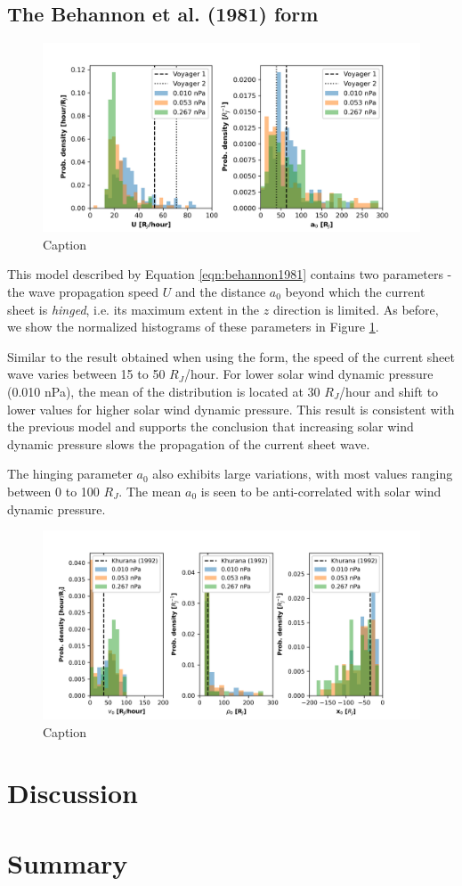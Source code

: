 \subsection{The Behannon et al. (1981) form}
\begin{figure}
    \centering
    \includegraphics[width=\textwidth]{images6/comparison_highdynP_behannon.png}
    \caption{Caption}
    \label{fig:comparison-hist-behannon}
\end{figure}

This model described by Equation \ref{eqn:behannon1981} contains two parameters - the wave propagation speed $U$ and the distance $a_0$ beyond which the current sheet is \emph{hinged}, i.e. its maximum extent in the $z$ direction is limited. As before, we show the normalized histograms of these parameters in Figure \ref{fig:comparison-hist-behannon}. 

Similar to the result obtained when using the  form, the speed of the current sheet wave varies between 15 to 50 $R_J$/hour. For lower solar wind dynamic pressure (0.010 nPa), the mean of the distribution is located at 30 $R_J$/hour and shift to lower values for higher solar wind dynamic pressure. This result is consistent with the previous model and supports the conclusion that increasing solar wind dynamic pressure slows the propagation of the current sheet wave. 

The hinging parameter $a_0$ also exhibits large variations, with most values ranging between 0 to 100 $R_J$. The mean $a_0$ is seen to be anti-correlated with solar wind dynamic pressure. 
 
\begin{figure}
    \centering
    \includegraphics[width=\textwidth]{images6/comparison_highdynP_khurana.png}
    \caption{Caption}
    \label{fig:comparison-hist-khurana}
\end{figure}


\section{Discussion}
\section{Summary}